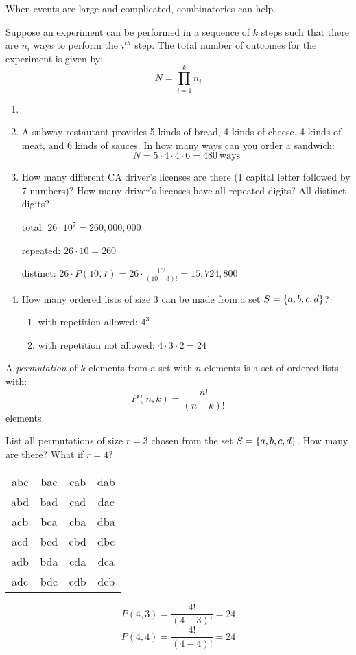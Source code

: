 \documentclass[letterpaper,12pt,fleqn]{article}
\begin{document}
When events are large and complicated, combinatorics can help.

\begin{theorem}
  Suppose an experiment can be performed in a sequence of \(k\) steps such that there are \(n_i\) ways to perform the
  \(i^{th}\) step.  The total number of outcomes for the experiment is given by:
  \[N=\prod_{i=1}^kn_i\]
\end{theorem}

\begin{examples}
  \begin{enumerate}
  \item[]
  \item A subway restautant provides 5 kinds of bread, 4 kinds of cheese, 4 kinds of meat, and 6 kinds of sauces.  In how
    many ways can you order a sandwich:
    \[N=5\cdot4\cdot4\cdot6=480\ \text{ways}\]

  \item How many different CA driver's licenses are there (1 capital letter followed by 7 numbers)?  How many driver's
    licenses have all repeated digits?  All distinct digits?

    total: \(26\cdot10^7=260,000,000\)

    repeated: \(26\cdot10=260\)

    distinct: \(26\cdot P(10,7)=26\cdot\frac{10!}{(10-3)!}=15,724,800\)

  \item How many ordered lists of size 3 can be made from a set \(S=\{a,b,c,d\}\)?
    \begin{enumerate}
    \item with repetition allowed: \(4^3\)
    \item with repetition not allowed: \(4\cdot3\cdot2=24\)
    \end{enumerate}
  \end{enumerate}
\end{examples}

\begin{definition}[Permutation]
  A \emph{permutation} of \(k\) elements from a set with \(n\) elements is a set of ordered lists with:
  \[P(n,k)=\frac{n!}{(n-k)!}\]
  elements.
\end{definition}

\begin{example}
  List all permutations of size \(r=3\) chosen from the set \(S=\{a,b,c,d\}\).  How many are there?  What if \(r=4\)?

  \begin{tabular}{cccc}
    abc & bac & cab & dab \\
    abd & bad & cad & dac \\
    acb & bca & cba & dba \\
    acd & bcd & cbd & dbc \\
    adb & bda & cda & dca \\
    adc & bdc & cdb & dcb
  \end{tabular}
  \[P(4,3)=\frac{4!}{(4-3)!}=24\]
  \[P(4,4)=\frac{4!}{(4-4)!}=24\]
\end{example}
\end{document}
